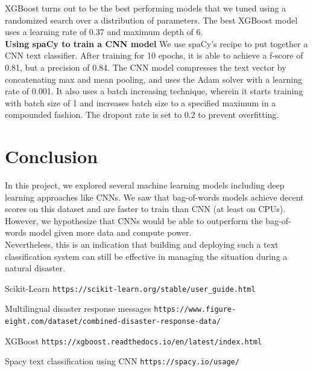 \documentclass{article}
\begin{document}
XGBoost\cite{xgboost} turns out to be the best performing models that we tuned using a randomized search over a distribution of parameters. The best XGBoost model uses a learning rate of 0.37 and maximum depth of 6.
\\

\textbf{Using spaCy to train a CNN model} We use spaCy's recipe to put together a CNN text classifier\cite{spacy}. After training for 10 epochs, it is able to achieve a f-score of 0.81, but a precision of 0.84. The CNN model compresses the text vector by concatenating max and mean pooling, and uses the Adam solver with a learning rate of 0.001. It also uses a batch increasing technique, wherein it starts training with batch size of 1 and increases batch size to a specified maximum in a compounded fashion. The dropout rate is set to 0.2 to prevent overfitting.

\section{Conclusion}
In this project, we explored several machine learning models including deep learning approaches like CNNs. We saw that bag-of-words models achieve decent scores on this dataset and are faster to train than CNN (at least on CPUs). However, we hypothesize that CNNs would be able to outperform the bag-of-words model given more data and compute power.
\\

Nevertheless, this is an indication that building and deploying such a text classification system can still be effective in managing the situation during a natural disaster.

\begin{thebibliography}{1}
	
	 Scikit-Learn \texttt{https://scikit-learn.org/stable/user\_guide.html}
	
	 Multilingual disaster response messages \texttt{https://www.figure-eight.com/dataset/combined-disaster-response-data/}
	
	 XGBoost \texttt{https://xgboost.readthedocs.io/en/latest/index.html}
	
	 Spacy text classification using CNN \texttt{https://spacy.io/usage/}
	
\end{thebibliography}
\end{document}

